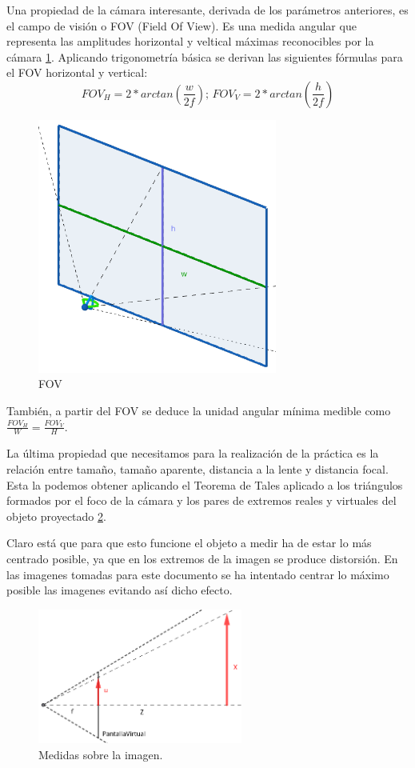 \documentclass[12pt]{article}
\begin{document}
Una propiedad de la cámara interesante, derivada de los parámetros anteriores, es el campo de visión o FOV (Field Of View). 
Es una medida angular que representa las amplitudes horizontal y veltical máximas reconocibles por la cámara \ref{fig:Modelo_fov}.
Aplicando trigonometría básica se derivan las siguientes fórmulas para el FOV horizontal y vertical:
$$ FOV_H = 2*arctan \left( \frac{w}{2f} \right) \text{;     } FOV_V = 2*arctan \left( \frac{h}{2f} \right)$$ 
\begin{figure}[h!]
    \centering
    \includegraphics[width=0.7\textwidth]{images_calibracion/Modelo_fov.png}  %
    \caption{FOV}
    \label{fig:Modelo_fov}
\end{figure}
También, a partir del FOV se deduce la unidad angular mínima medible como $\frac{FOV_H}{W} = \frac{FOV_V}{H}$.

La última propiedad que necesitamos para la realización de la práctica es la relación entre tamaño, tamaño aparente, distancia a la lente y distancia focal.
Esta la podemos obtener aplicando el Teorema de Tales aplicado a los triángulos formados por el foco de la cámara y los pares de extremos reales y virtuales del objeto proyectado \ref{fig:Tales}. 

Claro está que para que esto funcione el objeto a medir ha de estar lo más centrado posible, ya que en los extremos de la imagen se produce distorsión. En las imagenes tomadas para este documento se ha intentado centrar lo máximo posible las imagenes evitando así dicho efecto.

\begin{figure}[H]
    \centering
    \includegraphics[width=0.6\textwidth]{images_calibracion/Tales.png}  
    \caption{Medidas sobre la imagen.}
    \label{fig:Tales}
\end{figure}
\end{document}
